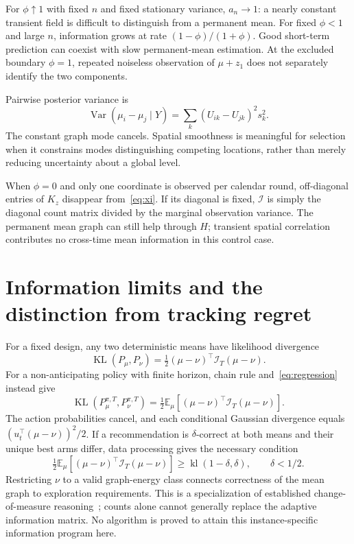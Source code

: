 \documentclass[11pt]{article}
\newcommand{\E}{\mathbb E}
\newcommand{\Var}{\operatorname{Var}}
\newcommand{\KL}{\operatorname{KL}}
\begin{document}
For $\phi\uparrow1$ with fixed $n$ and fixed stationary variance, $a_n\to1$: a nearly constant transient field is difficult to distinguish from a permanent mean. For fixed $\phi<1$ and large $n$, information grows at rate $(1-\phi)/(1+\phi)$. Good short-term prediction can coexist with slow permanent-mean estimation. At the excluded boundary $\phi=1$, repeated noiseless observation of $\mu+z_1$ does not separately identify the two components.

Pairwise posterior variance is
\begin{equation}
\Var(\mu_i-\mu_j\mid Y)=\sum_k(U_{ik}-U_{jk})^2s_k^2.
\end{equation}
The constant graph mode cancels. Spatial smoothness is meaningful for selection when it constrains modes distinguishing competing locations, rather than merely reducing uncertainty about a global level.

When $\phi=0$ and only one coordinate is observed per calendar round, off-diagonal entries of $K_z$ disappear from~\eqref{eq:xi}. If its diagonal is fixed, $\mathcal I$ is simply the diagonal count matrix divided by the marginal observation variance. The permanent mean graph can still help through $H$; transient spatial correlation contributes no cross-time mean information in this control case.

\section{Information limits and the distinction from tracking regret}
For a fixed design, any two deterministic means have likelihood divergence
\begin{equation}
\KL(P_\mu,P_\nu)=\tfrac12(\mu-\nu)^\top\mathcal I_T(\mu-\nu).
\end{equation}
For a non-anticipating policy with finite horizon, chain rule and~\eqref{eq:regression} instead give
\begin{equation}
\boxed{\KL(P_\mu^{\pi,T},P_\nu^{\pi,T})
=\tfrac12\E_\mu[(\mu-\nu)^\top\mathcal I_T(\mu-\nu)].}
\label{eq:adaptive-kl}
\end{equation}
The action probabilities cancel, and each conditional Gaussian divergence equals $(u_t^\top(\mu-\nu))^2/2$. If a recommendation is $\delta$-correct at both means and their unique best arms differ, data processing gives the necessary condition
\begin{equation}
\tfrac12\E_\mu[(\mu-\nu)^\top\mathcal I_T(\mu-\nu)]
\ge\operatorname{kl}(1-\delta,\delta),\qquad \delta<1/2.
\end{equation}
Restricting $\nu$ to a valid graph-energy class connects correctness of the mean graph to exploration requirements. This is a specialization of established change-of-measure reasoning~\cite{combes2017,garivier2016}; counts alone cannot generally replace the adaptive information matrix. No algorithm is proved to attain this instance-specific information program here.
\end{document}
